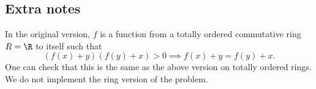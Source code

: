 \subsection*{Extra notes}

In the original version, $f$ is a function from a totally ordered commutative ring $R = \R$ to itself such that
\[ (f(x) + y)(f(y) + x) > 0 \implies f(x) + y = f(y) + x. \]
One can check that this is the same as the above version on totally ordered rings.
We do not implement the ring version of the problem.
